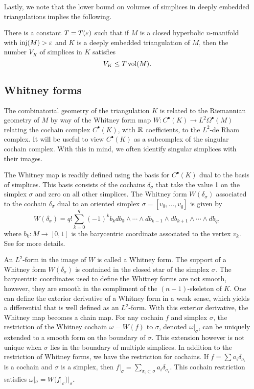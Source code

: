 Lastly, we note that the lower bound on volumes of simplices in deeply embedded triangulations implies the following.

\begin{prop} \label{prop: volume}There is a constant $T=T(\varepsilon)$ such that if $M$ is a closed hyperbolic $n$-manifold with $\operatorname{inj}(M)>\varepsilon$ and $K$ is a deeply embedded triangulation of $M$, then the number $V_K$ of simplices in $K$ satisfies $$V_K\leq T\operatorname{vol}(M).$$
\end{prop}



\subsection{Whitney forms}

The combinatorial geometry of the triangulation $K$ is related to the Riemannian geometry of $M$ by way of the Whitney form map $W:C^{\bullet}(K)\to L^2\Omega^{\bullet}(M)$ relating the cochain complex $C^{\bullet}(K)$, with $\mathbb R$ coefficients, to the $L^2$-de Rham complex. It will be useful to view $C^{\bullet}(K)$ as a subcomplex of the singular cochain complex. With this in mind, we often identify singular simplices with their images.

The Whitney map is readily defined using the basis for $C^{\bullet}(K)$ dual to the basis of simplices. This basis consists of the cochains $\delta_{\sigma}$ that take the value 1 on the simplex $\sigma$ and zero on all other simplices.
The Whitney form $W(\delta_{\sigma})$ associated to the cochain $\delta_{\sigma}$ dual to an  oriented simplex $\sigma = [v_0,\dots,v_q]$ is given by
$$W(\delta_{\sigma}) = q! \sum_{k=0}^q(-1)^kb_{k}db_0\wedge \cdots \wedge db_{k-1}\wedge db_{k+1}\wedge \cdots \wedge d b_q,$$
where $b_k:M\to [0,1]$ is the barycentric coordinate associated to the vertex $v_k$. See \cite{Dodziuk} for more details.

An $L^2$-form in the image of $W$  is called a Whitney form. The support of a Whitney form $W(\delta_{\sigma})$ is contained in the closed star of the simplex $\sigma$. The barycentric coordinates used to define the Whitney forms are not smooth, however, they are smooth in the compliment of the $(n-1)$-skeleton of $K$. One can define the exterior derivative of a Whitney form in a weak sense, which yields a differential that is well defined as an $L^2$-form. With this exterior derivative, the Whitney map becomes a chain map. For any cochain $f$ and simplex $\sigma$, the restriction of the Whitney cochain $\omega= W(f)$ to $\sigma$, denoted $\omega|_{\sigma}$, can be uniquely extended to a smooth form on the boundary of $\sigma$. This extension however is not unique when $\sigma$ lies in the boundary of multiple simplices. In addition to the restriction of Whitney forms, we have the restriction for cochains.
If $f= \sum a_i \delta_{\sigma_i}$ is a cochain and $\sigma$ is a simplex, then $f|_{\sigma} = \sum\limits_{\sigma_i\subset\sigma}a_i\delta_{\sigma_i}.$ This cochain restriction satisfies $\omega|_{\sigma} = W(f|_{\sigma})|_{\sigma}$.

